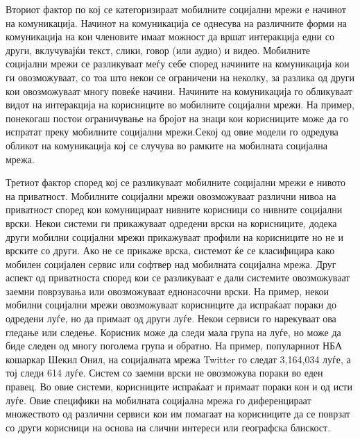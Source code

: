 Вториот фактор по кој се категоризираат мобилните социјални мрежи е начинот на
комуникација. Начинот на комуникација се однесува на различните форми на
комуникација на кои членовите имаат можност да вршат интеракција едни со други,
вклучувајќи текст, слики, говор (или аудио) и видео. Мобилните социјални мрежи
се разликуваат меѓу себе според начините на комуникација кои ги овозможуваат, со
тоа што некои се ограничени на неколку, за разлика од други кои овозможуваат
многу повеќе начини. Начините на комуникација го обликуваат видот на интеракција
на корисниците во мобилните социјални мрежи. На пример, понекогаш постои
ограничување на бројот на знаци кои корисниците може да го испратат преку
мобилните социјални мрежи.Секој од овие модели го одредува обликот на
комуникација кој се случува во рамките на мобилната социјална мрежа.

Третиот фактор според кој се разликуваат мобилните социјални мрежи е нивото на
приватност. Мобилните социјални мрежи овозможуваат различни нивоа на приватност
според кои комуницираат нивните корисници со нивните социјални врски. Некои
системи ги прикажуваат одредени врски на корисниците, додека други мобилни
социјални мрежи прикажуваат профили на корисниците но не и врските со други. Ако
не се прикаже врска, системот ќе се класифицира како мобилен социјален сервис
или софтвер над мобилната социјална мрежа. Друг аспект од приватноста според кои
се разликуваат е дали системите овозможуваат заемни поврзувања или овозможуваат
еднонасочни врски. На пример, некои мобилни социјални мрежи овозможуваат
корисниците да испраќаат пораки до одредени луѓе, но да примаат од други луѓе.
Некои сервиси го нарекуваат ова гледање или следење. Корисник може да следи мала
група на луѓе, но може да биде следен од многу поголема група и обратно. На
пример, популарниот НБА кошаркар Шекил Онил, на социјалната мрежа Twitter го
следат 3,164,034 луѓе, а тој следи 614 луѓе. Систем со заемни врски не
овозможува пораки во еден правец. Во овие системи, корисниците испраќаат и
примаат пораки кон и од исти луѓе. Овие специфики на мобилната социјална мрежа
го диференцираат множеството од различни сервиси кои им помагаат на корисниците
да се поврзат со други корисници на основа на слични интереси или географска
блискост.


